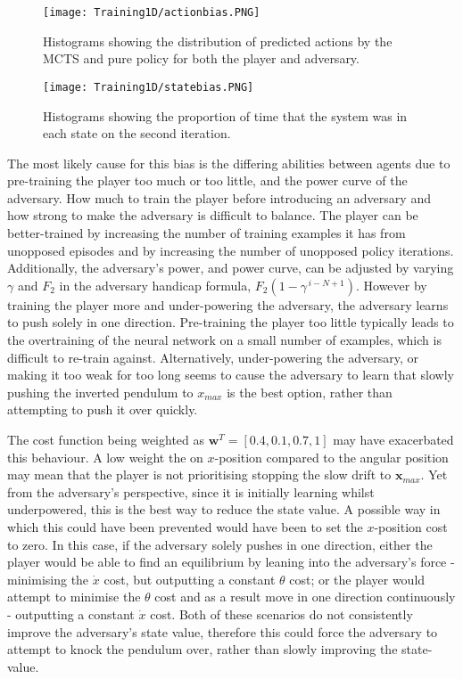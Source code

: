 \documentclass[../main.tex]{subfiles}
\begin{document}
\begin{figure}[H]
    \centering
    \texttt{[image: Training1D/actionbias.PNG]}
    \caption{Histograms showing the distribution of predicted actions by the MCTS and pure policy for both the player and adversary.}
    \label{fig:actionbias}
    \vspace{0.7cm}
    \centering
    \texttt{[image: Training1D/statebias.PNG]}
    \caption{Histograms showing the proportion of time that the system was in each state on the second iteration.}
    \label{fig:statebias}
\end{figure}

The most likely cause for this bias is the differing abilities between agents due to pre-training the player too much or too little, and the power curve of the adversary. How much to train the player before introducing an adversary and how strong to make the adversary is difficult to balance. The player can be better-trained by increasing the number of training examples it has from unopposed episodes and by increasing the number of unopposed policy iterations. Additionally, the adversary's power, and power curve, can be adjusted by varying $\gamma$ and $F_2$ in the adversary handicap formula, $F_2(1-\gamma^{\, i-N+1})$. However by training the player more and under-powering the adversary, the adversary learns to push solely in one direction. Pre-training the player too little typically leads to the overtraining of the neural network on a small number of examples, which is difficult to re-train against. Alternatively, under-powering the adversary, or making it too weak for too long seems to cause the adversary to learn that slowly pushing the inverted pendulum to $x_{max}$ is the best option, rather than attempting to push it over quickly.

The cost function being weighted as $\boldsymbol{w}^T = [0.4, 0.1, 0.7, 1]$ may have exacerbated this behaviour. A low weight the on $x$-position compared to the angular position may mean that the player is not prioritising stopping the slow drift to $\boldsymbol{x}_{max}$. Yet from the adversary's perspective, since it is initially learning whilst underpowered, this is the best way to reduce the state value. A possible way in which this could have been prevented would have been to set the $x$-position cost to zero. In this case, if the adversary solely pushes in one direction, either the player would be able to find an equilibrium by leaning into the adversary's force - minimising the $\dot{x}$ cost, but outputting a constant $\theta$ cost; or the player would attempt to minimise the $\theta$ cost and as a result move in one direction continuously - outputting a constant $\dot{x}$ cost. Both of these scenarios do not consistently improve the adversary's state value, therefore this could force the adversary to attempt to knock the pendulum over, rather than slowly improving the state-value.
\end{document}
